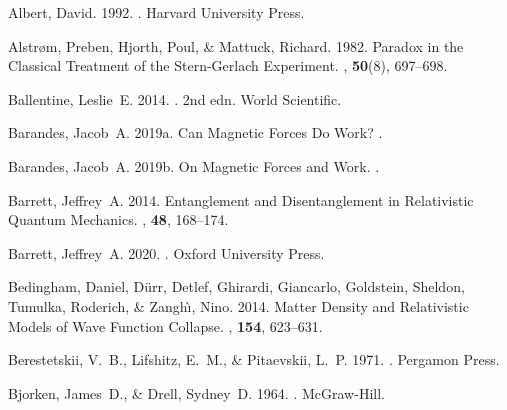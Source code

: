 \documentclass[12pt,secnumarabic,amsmath,amssymb,balancelastpage,nofootinbib]{article}
\begin{document}
\begin{thebibliography}{}

Albert, David. 1992.
.
\newblock Harvard University Press.

Alstr{\o}m, Preben, Hjorth, Poul, \& Mattuck, Richard. 1982.
\newblock Paradox in the Classical Treatment of the Stern-Gerlach Experiment.
, {\bf 50}(8), 697--698.

Ballentine, Leslie~E. 2014.
. 2nd edn.
\newblock World Scientific.

Barandes, Jacob~A. 2019a.
\newblock Can Magnetic Forces Do Work?
.

Barandes, Jacob~A. 2019b.
\newblock On Magnetic Forces and Work.
.

Barrett, Jeffrey~A. 2014.
\newblock Entanglement and Disentanglement in Relativistic Quantum Mechanics.
, {\bf 48},
  168--174.

Barrett, Jeffrey~A. 2020.
.
\newblock Oxford University Press.

Bedingham, Daniel, D\"urr, Detlef, Ghirardi, Giancarlo, Goldstein, Sheldon,
  Tumulka, Roderich, \& Zangh\`{\i}, Nino. 2014.
\newblock Matter Density and Relativistic Models of Wave Function Collapse.
, {\bf 154}, 623--631.

Berestetskii, V.~B., Lifshitz, E.~M., \& Pitaevskii, L.~P. 1971.
.
\newblock Pergamon Press.

Bjorken, James~D., \& Drell, Sydney~D. 1964.
.
\newblock McGraw-Hill.


\end{thebibliography}
\end{document}

